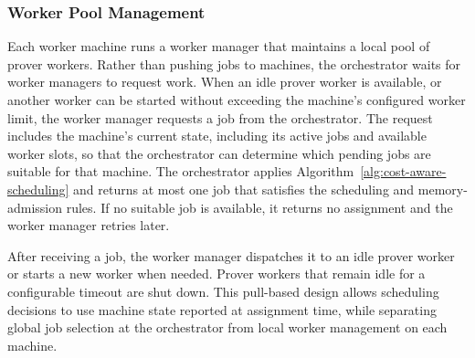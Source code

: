
\subsubsection{\textbf{Worker Pool Management}}

Each worker machine runs a worker manager that maintains a local pool of prover workers. Rather than pushing jobs to machines, the orchestrator waits for worker managers to request work. When an idle prover worker is available, or another worker can be started without exceeding the machine's configured worker limit, the worker manager requests a job from the orchestrator. The request includes the machine's current state, including its active jobs and available worker slots, so that the orchestrator can determine which pending jobs are suitable for that machine. The orchestrator applies Algorithm~\ref{alg:cost-aware-scheduling} and returns at most one job that satisfies the scheduling and memory-admission rules. If no suitable job is available, it returns no assignment and the worker manager retries later.

After receiving a job, the worker manager dispatches it to an idle prover worker or starts a new worker when needed. Prover workers that remain idle for a configurable timeout are shut down. This pull-based design allows scheduling decisions to use machine state reported at assignment time, while separating global job selection at the orchestrator from local worker management on each machine.


